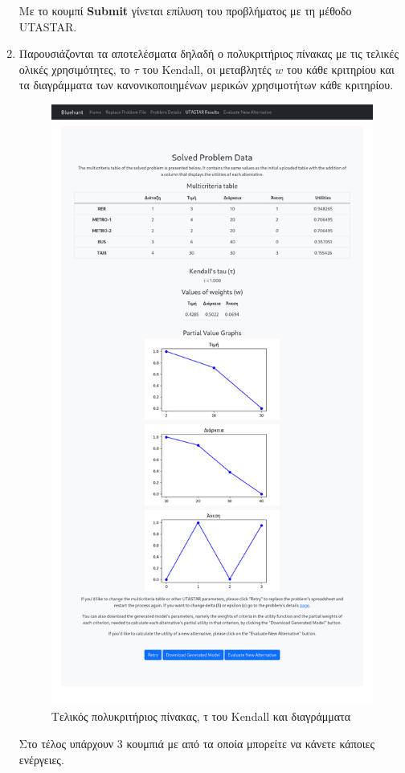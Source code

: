\documentclass[11pt,a4paper,titlepage]{article}
\numberwithin{equation}{section}
\begin{document}
\begin{enumerate}
	Με το κουμπί \textbf{Submit} γίνεται επίλυση του προβλήματος με τη μέθοδο UTASTAR.
	
	\item Παρουσιάζονται τα αποτελέσματα δηλαδή ο πολυκριτήριος πίνακας με τις τελικές ολικές χρησιμότητες, το $τ$ του Kendall, οι μεταβλητές $w$ του κάθε κριτηρίου και τα διαγράμματα των κανονικοποιημένων μερικών χρησιμοτήτων κάθε κριτηρίου. 
	
	\begin{figure}[H]
		\centering
		\includegraphics[width=0.8\linewidth]{media/results.png}
		\caption{Τελικός πολυκριτήριος πίνακας, τ του Kendall και διαγράμματα}
		\label{fig:results_1}
	\end{figure}
	

	Στο τέλος υπάρχουν 3 κουμπιά με από τα οποία μπορείτε να κάνετε κάποιες ενέργειες.
	

\end{enumerate}
\end{document}
